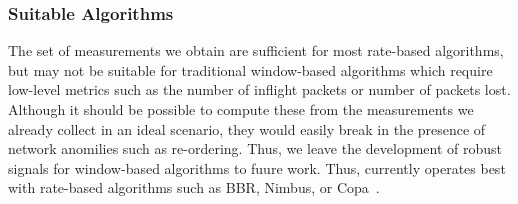 \subsubsection{Suitable Algorithms}
\label{s:measure:limitation:algs}
The set of measurements we obtain are sufficient for most rate-based algorithms, but may not be 
suitable for traditional window-based algorithms which require low-level metrics such as 
the number of inflight packets or number of packets lost. Although it should be possible
to compute these from the measurements we already collect in an ideal scenario, they would easily
break in the presence of network anomilies such as re-ordering. Thus, we leave the development
of robust signals for window-based algorithms to fuure work. 
Thus, \name currently operates best with rate-based algorithms such as BBR, Nimbus, or Copa~\cite{bbr,nimbus,copa}.
